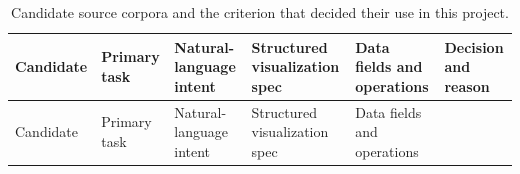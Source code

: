 \begin{landscape}
\begingroup\scriptsize\setlength{\tabcolsep}{3pt}\sloppy
\begin{longtable}[]{@{}
  >{\raggedright\arraybackslash}p{}
  >{\raggedright\arraybackslash}p{}
  >{\raggedright\arraybackslash}p{}
  >{\raggedright\arraybackslash}p{}
  >{\raggedright\arraybackslash}p{}
  >{\raggedright\arraybackslash}p{}@{}}
\caption{Candidate source corpora and the criterion that decided their use in this project.}\tabularnewline
\toprule\noalign{}
\begin{minipage}[b]{\linewidth}\raggedright
Candidate
\end{minipage} & \begin{minipage}[b]{\linewidth}\raggedright
Primary task
\end{minipage} & \begin{minipage}[b]{\linewidth}\raggedright
Natural-language intent
\end{minipage} & \begin{minipage}[b]{\linewidth}\raggedright
Structured visualization spec
\end{minipage} & \begin{minipage}[b]{\linewidth}\raggedright
Data fields and operations
\end{minipage} & \begin{minipage}[b]{\linewidth}\raggedright
Decision and reason
\end{minipage} \\
\midrule\noalign{}
\endfirsthead
\toprule\noalign{}
\begin{minipage}[b]{\linewidth}\raggedright
Candidate
\end{minipage} & \begin{minipage}[b]{\linewidth}\raggedright
Primary task
\end{minipage} & \begin{minipage}[b]{\linewidth}\raggedright
Natural-language intent
\end{minipage} & \begin{minipage}[b]{\linewidth}\raggedright
Structured visualization spec
\end{minipage} & \begin{minipage}[b]{\linewidth}\raggedright
Data fields and operations
\end{minipage} & \begin{minipage}[b]{\linewidth}\raggedright

\end{minipage}
\end{longtable}
\end{landscape}

